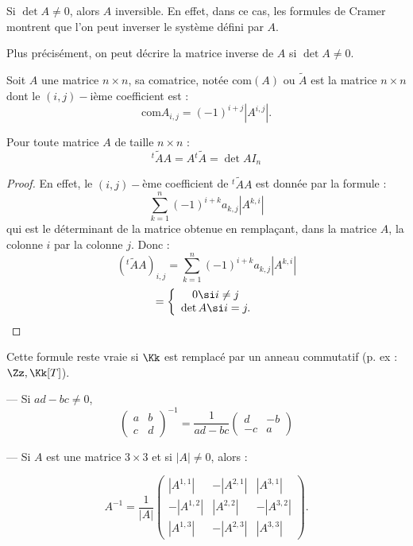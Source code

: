 \documentclass[class=report,crop=false]{standalone}
\begin{document}
\begin{remarque*}
Si $\det A \neq 0$, alors $A$ inversible. En effet, dans ce cas, les formules de Cramer montrent que l'on peut inverser le système défini par $A$.
\end{remarque*}

Plus précisément, on peut décrire la matrice inverse de $A$ si $\det A \neq 0$.

\begin{definition}[Comatrice]
Soit $A$ une matrice $n \times n$, sa comatrice, notée $\mathrm{com
}(A)$ ou $ \tilde{A}$ est la matrice $n \times n$ dont le $(i,j)-$ième coefficient est : \[ \text{com}{A}_{i,j} = (-1)^{i+j}|A^{i,j}|.\]
\end{definition}

\begin{corollaire}
Pour toute matrice $A$ de taille $n \times n$ :
\[{}^t\tilde{A} A = A{}^t\tilde{A}=\det A I_n \] 
\end{corollaire}

\begin{proof}
En effet, le $(i,j)-$ème coefficient de ${}^t\tilde{A} A $ est donnée par la formule :
\[\sum_{k=1}^n(-1)^{i+k}a_{k,j}|A^{k,i}|\]
qui est le déterminant de la matrice obtenue en rempla\c{c}ant, dans la matrice $A$, la colonne $i$ par la colonne $j$. Donc :
\[({}^t\tilde{A} A )_{i,j} = \sum_{k=1}^n(-1)^{i+k}a_{k,j}|A^{k,i}|\]
\[= \left\{\begin{array}{c}
0 \si i \neq j \\
\det A \si i=j.
\end{array}\right.\]
\end{proof}

\begin{remarque*}
Cette formule reste vraie si $\Kk$ est remplacé par un anneau commutatif (p. ex : $\Zz,  \Kk[T]$).
\end{remarque*}

\begin{exemple}

--- Si $ad-bc \neq 0$, \[\left(\begin{array}{cc}
a & b \\
c & d
\end{array}
\right)^{-1} = \frac{1}{ad-bc} \left(\begin{array}{cc}
d & -b \\
-c & a
\end{array}
\right)\]

--- Si $A$ est une matrice $3 \times 3$ et si $|A| \neq 0$, alors :

\[A^{-1}=\frac{1}{|A|} \left(\begin{array}{ccc}
|A^{1,1}|& -|A^{2,1}| & |A^{3,1}|\\
-|A^{1,2}| & |A^{2,2}| & -|A^{3,2}|\\
|A^{1,3}| & -|A^{2,3}| & |A^{3,3}|
\end{array}\right) .\]
\end{exemple}
\end{document}
